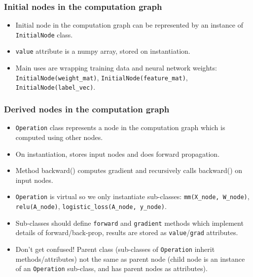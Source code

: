 \documentclass{beamer}
\begin{document}
\begin{frame}
  \frametitle{Initial nodes in the computation graph}
  \begin{itemize}
  \item Initial node in the computation graph can be represented by an
    instance of \texttt{InitialNode} class.
  \item \texttt{value} attribute is a numpy array, 
    stored on instantiation.
  \item Main uses are wrapping training data and neural network
    weights: \texttt{InitialNode(weight\_mat)},
    \texttt{InitialNode(feature\_mat)},
    \texttt{InitialNode(label\_vec)}.
  \end{itemize}


\end{frame}

\begin{frame}
  \frametitle{Derived nodes in the computation graph}
  \begin{itemize}
  \item \texttt{Operation} class represents a node in the computation
    graph which is computed using other nodes.
  \item On instantiation, stores input nodes and does forward
    propagation.
  \item Method backward() computes gradient and recursively calls
    backward() on input nodes.
  \item \texttt{Operation} is virtual so we only instantiate sub-classes:
    \texttt{mm(X\_node, W\_node)},
    \texttt{relu(A\_node)},
    \texttt{logistic\_loss(A\_node, y\_node)}.
  \item Sub-classes should define \texttt{forward} and
    \texttt{gradient} methods which implement details of
    forward/back-prop, results are stored as \texttt{value}/\texttt{grad}
    attributes.
  \item Don't get confused! Parent class (sub-classes of
    \texttt{Operation} inherit methods/attributes) not the same as
    parent node (child node is an instance of an \texttt{Operation}
    sub-class, and has parent nodes as attributes). 
  \end{itemize}
\end{frame}
\end{document}
